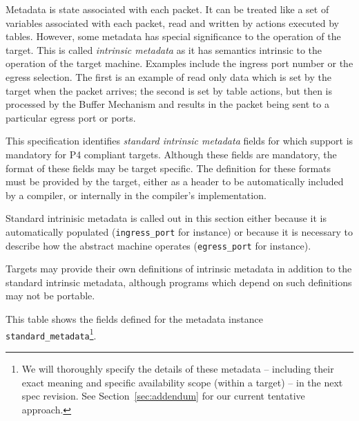 \documentclass[12pt]{article}
\begin{document}

Metadata is state associated with each packet. It can be treated like a set 
of variables associated with each packet, read and written by actions executed 
by tables. However, some metadata has special significance to the operation 
of the target. This is called \textit{intrinsic metadata} as it has semantics intrinsic 
to the operation of the target machine. Examples include the ingress port number 
or the egress selection. The first is an example of read only data which is 
set by the target when the packet arrives; the second is set by table actions, 
but then is processed by the Buffer Mechanism and results in the packet being 
sent to a particular egress port or ports.

This specification identifies \textit{standard intrinsic metadata} fields for which 
support is mandatory for P4 compliant targets. Although these fields are mandatory, 
the format of these fields may be target specific. The definition for these 
formats must be provided by the target, either as a header to be automatically 
included by a compiler, or internally in the compiler's implementation.

Standard intrinisic metadata is called out in this section either because 
it is automatically populated (\texttt{ingress_port} for instance) or because it 
is necessary to describe how the abstract machine operates (\texttt{egress_port} for 
instance).

Targets may provide their own definitions of intrinsic metadata in addition to the standard
intrinsic metadata, although programs which depend on such definitions may not be portable.

This table shows the fields defined for the metadata instance 
\texttt{standard_metadata}\footnote{We will thoroughly specify the details of these metadata 
-- including their exact meaning and specific availability scope (within a target) -- in 
the next spec revision. See Section~\ref{sec:addendum} for our current tentative approach.}.
\end{document}
